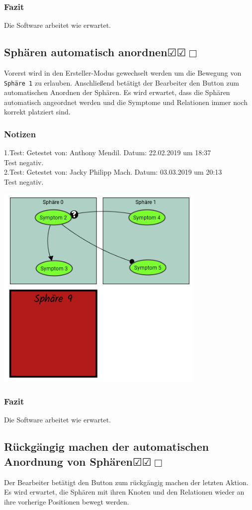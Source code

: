 \documentclass[enabledeprecatedfontcommands]{scrartcl}
\newcommand{\subsectiont}[2]{\subsection[#1]{#1{\normalsize\normalfont #2}}}
\newcommand{\leer}{$\Box$}
\newcommand{\ok}{$\CheckedBox$}
\begin{document}
\subsubsection{Fazit}
Die Software arbeitet wie erwartet.

\subsectiont{Sphären automatisch anordnen}{\dotfill\ok\ok\leer}
Vorerst wird in den Ersteller-Modus gewechselt werden um die Bewegung von \texttt{Sphäre 1} zu erlauben. Anschließend betätigt der Bearbeiter den Button zum automatischen Anordnen der Sphären. Es wird erwartet, dass die Sphären automatisch angeordnet werden und die Symptome und Relationen immer noch korrekt platziert sind.
\subsubsection{Notizen}
1.Test: Getestet von: Anthony Mendil. Datum: 22.02.2019 um 18:37 \\
Test negativ.\\
2.Test: Getestet von: Jacky Philipp Mach. Datum: 03.03.2019 um 20:13 \\
Test negativ. 
\begin{center}
\includegraphics[height=10cm]{2_17.PNG}
\end{center}
\subsubsection{Fazit}
Die Software arbeitet wie erwartet.

\subsectiont{Rückgängig machen der automatischen Anordnung von Sphären}{\dotfill\ok\ok\leer}
Der Bearbeiter betätigt den Button zum rückgängig machen der letzten Aktion. Es wird erwartet, die Sphären mit ihren Knoten und den Relationen wieder an ihre vorherige Positionen bewegt werden.
\end{document}
